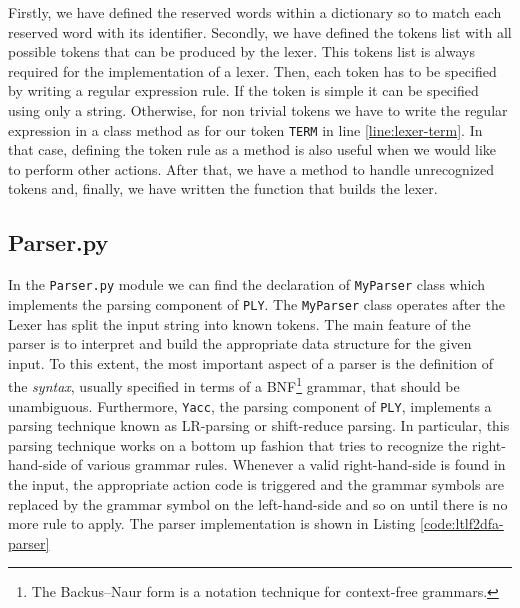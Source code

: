 Firstly, we have defined the reserved words within a dictionary so to match each reserved word with its identifier.
Secondly, we have defined the tokens list with all possible tokens that can be produced by the lexer. This tokens list is always required for the implementation of a lexer.
Then, each token has to be specified by writing a regular expression rule. If the token is simple it can be specified using only a string. Otherwise, for non trivial tokens we have to write the regular expression in a class method as for our token \texttt{TERM} in line \ref{line:lexer-term}. In that case, defining the token rule as a method is also useful when we would like to perform other actions. After that, we have a method to handle unrecognized tokens and, finally, we have written the function that builds the lexer.
\subsection{Parser.py}
In the \texttt{Parser.py} module we can find the declaration of \texttt{MyParser} class which implements the parsing component of \texttt{PLY}. The \texttt{MyParser} class operates after the Lexer has split the input string into known tokens. The main feature of the parser is to interpret and build the appropriate data structure for the given input. To this extent, the most important aspect of a parser is the definition of the \textit{syntax}, usually specified in terms of a BNF\footnote{The Backus–Naur form is a notation technique for context-free grammars.} grammar, that should be unambiguous. Furthermore, \texttt{Yacc}, the parsing component of \texttt{PLY}, implements a parsing technique known as LR-parsing or shift-reduce parsing. In particular, this parsing technique works on a bottom up fashion that tries to recognize the right-hand-side of various grammar rules. Whenever a valid right-hand-side is found in the input, the appropriate action code is triggered and the grammar symbols are replaced by the grammar symbol on the left-hand-side and so on until there is no more rule to apply. The parser implementation is shown in Listing \ref{code:ltlf2dfa-parser}
